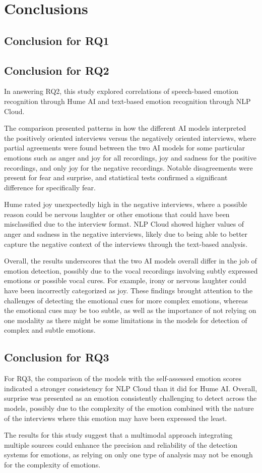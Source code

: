 \section{Conclusions}
\subsection{Conclusion for RQ1}

\subsection{Conclusion for RQ2}
In answering RQ2, this study explored correlations of speech-based emotion recognition through Hume AI and text-based emotion recognition through NLP Cloud. 

The comparison presented patterns in how the different AI models interpreted the positively oriented interviews versus the negatively oriented interviews, where partial agreements were found between the two AI models for some particular emotions such as anger and joy for all recordings, joy and sadness for the positive recordings, and only joy for the negative recordings. Notable disagreements were present for fear and surprise, and statistical tests confirmed a significant difference for specifically fear.

Hume rated joy unexpectedly high in the negative interviews, where a possible reason could be nervous laughter or other emotions that could have been misclassified due to the interview format. NLP Cloud showed higher values of anger and sadness in the negative interviews, likely due to being able to better capture the negative context of the interviews through the text-based analysis.

Overall, the results underscores that the two AI models overall differ in the job of emotion detection, possibly due to the vocal recordings involving subtly expressed emotions or possible vocal cures. For example, irony or nervous laughter could have been incorrectly categorized as joy. These findings brought attention to the challenges of detecting the emotional cues for more complex emotions, whereas the emotional cues may be too subtle, as well as the importance of not relying on one modality as there might be some limitations in the models for detection of complex and subtle emotions.

\subsection{Conclusion for RQ3}
For RQ3, the comparison of the models with the self-assessed emotion scores indicated a stronger consistency for NLP Cloud than it did for Hume AI.
Overall, surprise was presented as an emotion consistently challenging to detect across the models, possibly due to the complexity of the emotion combined with the nature of the interviews where this emotion may have been expressed the least.

The results for this study suggest that a multimodal approach integrating multiple sources could enhance the precision and reliability of the detection systems for emotions, as relying on only one type of analysis may not be enough for the complexity of emotions.
